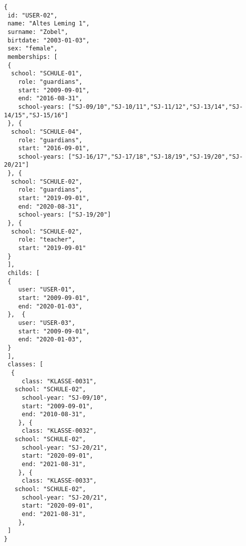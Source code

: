 
\begin{lstlisting}[caption={Beispiel für Benutzer mit Rollen 'teachers' und 'guardians'},frame=tlrb]
{
 id: "USER-02",
 name: "Altes Leming 1",
 surname: "Zobel",
 birtdate: "2003-01-03",
 sex: "female",
 memberships: [
 {
  school: "SCHULE-01",
	role: "guardians",
	start: "2009-09-01",
	end: "2016-08-31",
	school-years: ["SJ-09/10","SJ-10/11","SJ-11/12","SJ-13/14","SJ-14/15","SJ-15/16"]
 }, {
  school: "SCHULE-04",
	role: "guardians",
	start: "2016-09-01",
	school-years: ["SJ-16/17","SJ-17/18","SJ-18/19","SJ-19/20","SJ-20/21"]
 }, {
  school: "SCHULE-02",
	role: "guardians",
	start: "2019-09-01",
	end: "2020-08-31",
	school-years: ["SJ-19/20"]
 }, {
  school: "SCHULE-02",
	role: "teacher",
	start: "2019-09-01"
 }
 ],
 childs: [
 {
	user: "USER-01",
	start: "2009-09-01",
	end: "2020-01-03",
 },  {
	user: "USER-03",
	start: "2009-09-01",
	end: "2020-01-03",
 }
 ],
 classes: [
  {
	 class: "KLASSE-0031",
   school: "SCHULE-02",
	 school-year: "SJ-09/10",
	 start: "2009-09-01",
	 end: "2010-08-31",
	}, {
	 class: "KLASSE-0032",
   school: "SCHULE-02",
	 school-year: "SJ-20/21",
	 start: "2020-09-01",
	 end: "2021-08-31",
	}, {
	 class: "KLASSE-0033",
   school: "SCHULE-02",
	 school-year: "SJ-20/21",
	 start: "2020-09-01",
	 end: "2021-08-31",
	}, 
 ]
}
\end{lstlisting}
